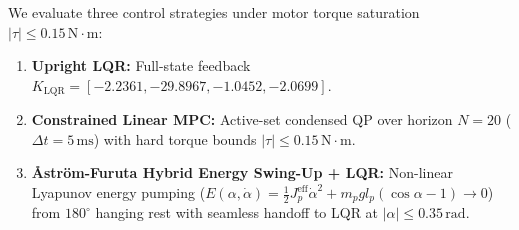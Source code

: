 \documentclass[11pt,a4paper]{article}
\begin{document}
We evaluate three control strategies under motor torque saturation $|\tau| \le 0.15\,\text{N}\cdot\text{m}$:
\begin{enumerate}[nosep]
  \item \textbf{Upright LQR:} Full-state feedback $K_{\text{LQR}} = [-2.2361, -29.8967, -1.0452, -2.0699]$.
  \item \textbf{Constrained Linear MPC:} Active-set condensed QP over horizon $N=20$ ($\Delta t = 5\,\text{ms}$) with hard torque bounds $|\tau| \le 0.15\,\text{N}\cdot\text{m}$.
  \item \textbf{Åström-Furuta Hybrid Energy Swing-Up + LQR:} Non-linear Lyapunov energy pumping ($E(\alpha, \dot\alpha) = \frac{1}{2}J_p^{\text{eff}}\dot\alpha^2 + m_p g l_p(\cos\alpha - 1) \to 0$) from $180^\circ$ hanging rest with seamless handoff to LQR at $|\alpha| \le 0.35\,\text{rad}$.
\end{enumerate}

\begin{table}[H]
\centering
\small
{}
\caption{Benchmark results for Experiment 28: Furuta rotary inverted pendulum upright regulation and underactuated swing-up (from \texttt{experiments/28\_furuta\_pendulum\_control/table.md}).}
\label{tab:exp28}
\end{table}
\end{document}
